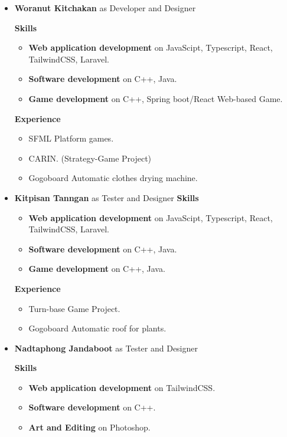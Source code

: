 \documentclass[a4paper, 12pt]{report}
\begin{document}
\begin{itemize}
                \item \textbf{Woranut Kitchakan} as Developer and Designer

                \textbf{Skills}
                \begin{itemize}
                    \item \textbf{Web application development} on JavaScipt, Typescript, React, TailwindCSS, Laravel.
                    \item \textbf{Software development} on C++, Java.
                    \item \textbf{Game development} on C++, Spring boot/React Web-based Game.
                \end{itemize}

                \textbf{Experience}
                \begin{itemize}
                    \item SFML Platform games.
                    \item CARIN. (Strategy-Game Project)
                    \item Gogoboard Automatic clothes drying machine.
                \end{itemize}

            \item \textbf{Kitpisan Tanngan} as Tester and Designer
                \textbf{Skills}
                \begin{itemize}
                    \item \textbf{Web application development} on JavaScipt, Typescript, React, TailwindCSS, Laravel.
                    \item \textbf{Software development} on  C++, Java.
                    \item \textbf{Game development} on C++, Java.
                \end{itemize}
            
                \textbf{Experience}
                \begin{itemize}
                    \item Turn-base Game Project.
                    \item Gogoboard Automatic roof for plants.
                \end{itemize}

            \item \textbf{Nadtaphong Jandaboot} as Tester and Designer
            
                \textbf{Skills}
                \begin{itemize}
                    \item \textbf{Web application development} on TailwindCSS.
                    \item \textbf{Software development} on C++.
                    \item \textbf{Art and Editing} on Photoshop. 
                \end{itemize}


\end{itemize}
\end{document}
